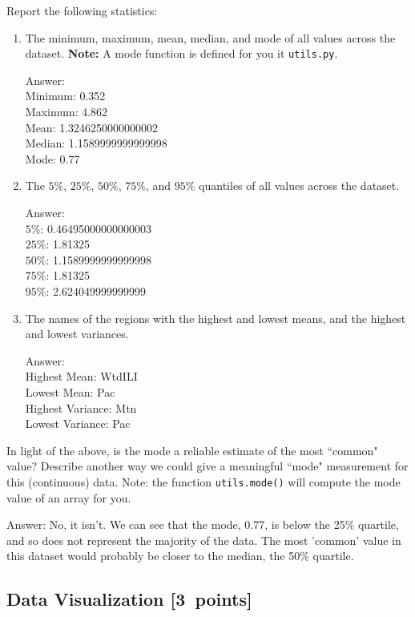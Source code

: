 \documentclass{article}
\newcommand{\blu}[1]{{\textcolor{blu}{#1}}}
\newenvironment{answer}{\par\begingroup\color{gre}Answer: }{\endgroup}
\let\ask\blu
\newcommand\pts[1]{\textcolor{pointscolour}{[#1~points]}}
\begin{document}
  \ask{Report the following statistics}:
  \begin{enumerate}
  \item The minimum, maximum, mean, median, and mode of all values across the dataset. \textbf{Note:} A mode function is defined for you it \texttt{utils.py}.
  \begin{answer}\\
  Minimum: 0.352 \\
  Maximum: 4.862 \\
  Mean: 1.3246250000000002 \\
  Median: 1.1589999999999998 \\
  Mode: 0.77
  \end{answer}
  \item The $5\%$, $25\%$, $50\%$, $75\%$, and $95\%$ quantiles of all values across the dataset.
  \begin{answer}\\
  $5\%$: 0.46495000000000003 \\
  $25\%$: 1.81325 \\
  $50\%$: 1.1589999999999998 \\
  $75\%$: 1.81325 \\
  $95\%$: 2.624049999999999 
  \end{answer}
  \item The names of the regions with the highest and lowest means, and the highest and lowest variances.
  \begin{answer}\\
  Highest Mean: WtdILI\\
  Lowest Mean: Pac\\
  Highest Variance: Mtn\\
  Lowest Variance: Pac
  \end{answer}
  \end{enumerate}
  In light of the above, \ask{is the mode a reliable estimate of the most ``common" value? Describe another way we could give a meaningful ``mode" measurement for this (continuous) data.} Note: the function \texttt{utils.mode()} will compute the mode value of an array for you.
  \begin{answer}
  No, it isn't. We can see that the mode, 0.77, is below the 25\% quartile, and so does not represent the majority of the data. The most 'common' value in this dataset would probably be closer to the median, the 50\% quartile.
  \end{answer}

  \subsection{Data Visualization \pts{3}}
\end{document}
